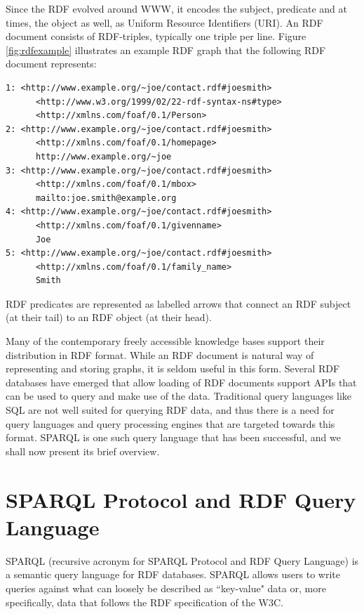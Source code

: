 \documentclass[a4paper, twoside, 12pt]{report}
\begin{document}
Since the RDF evolved around WWW, it encodes the subject, predicate and at times, the object as well, as Uniform Resource Identifiers (URI). An RDF document consists of RDF-triples, typically one triple per line. Figure \ref{fig:rdfexample} illustrates an example RDF graph that the following RDF document represents:

\begin{verbatim}
1: <http://www.example.org/~joe/contact.rdf#joesmith>
      <http://www.w3.org/1999/02/22-rdf-syntax-ns#type>  
      <http://xmlns.com/foaf/0.1/Person>
2: <http://www.example.org/~joe/contact.rdf#joesmith>   
      <http://xmlns.com/foaf/0.1/homepage>
      http://www.example.org/~joe
3: <http://www.example.org/~joe/contact.rdf#joesmith>  
      <http://xmlns.com/foaf/0.1/mbox>
      mailto:joe.smith@example.org
4: <http://www.example.org/~joe/contact.rdf#joesmith>
      <http://xmlns.com/foaf/0.1/givenname>
      Joe
5: <http://www.example.org/~joe/contact.rdf#joesmith>  
      <http://xmlns.com/foaf/0.1/family_name>
      Smith
\end{verbatim}

RDF predicates are represented as labelled arrows that connect an RDF subject (at their tail) to an RDF object (at their head).

Many of the contemporary freely accessible knowledge bases support their distribution in RDF format. While an RDF document is natural way of representing and storing graphs, it is seldom useful in this form. Several RDF databases have emerged that allow loading of RDF documents support APIs that can be used to query and make use of the data. Traditional query languages like SQL are not well suited for querying RDF data, and thus there is a need for query languages and query processing engines that are targeted towards this format. SPARQL is one such query language that has been successful, and we shall now present its brief overview. 


\section[SPARQL]{SPARQL Protocol and RDF Query Language}

SPARQL\cite{prud2008sparql} (recursive acronym for SPARQL Protocol and RDF Query Language) is a semantic query language for RDF databases. SPARQL allows users to write queries against what can loosely be described as ``key-value" data or, more specifically, data that follows the RDF specification of the W3C. 
\end{document}
